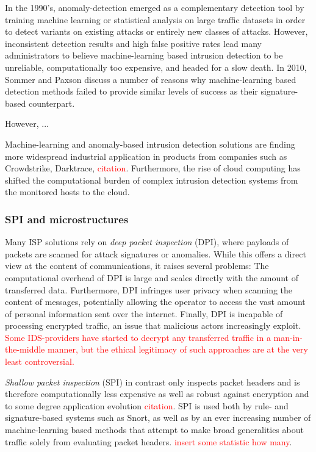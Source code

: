 In the 1990's, anomaly-detection emerged as a complementary detection tool by training machine learning or statistical analysis on large traffic datasets in order to detect variants on existing attacks or entirely new classes of attacks. However, inconsistent detection results and high false positive rates lead many administrators to believe machine-learning based intrusion detection to be unreliable, computationally too expensive, and headed for a slow death.
In 2010, Sommer and Paxson discuss a number of reasons why machine-learning based detection methods failed to provide similar levels of success as their signature-based counterpart.

However, ...

Machine-learning and anomaly-based intrusion detection solutions are finding more widespread industrial application in products from companies such as Crowdstrike, Darktrace, \textcolor{red}{citation}. Furthermore, the rise of cloud computing has shifted the computational burden of complex intrusion detection systems from the monitored hosts to the cloud.


\subsubsection{SPI and microstructures}

Many ISP solutions rely on \emph{deep packet inspection} (DPI), where payloads of packets are scanned for attack signatures or anomalies. While this offers a direct view at the content of communications, it raises several problems: The computational overhead of DPI is large and scales directly with the amount of transferred data. Furthermore, DPI infringes user privacy when scanning the content of messages, potentially allowing the operator to access the vast amount of personal information sent over the internet. Finally, DPI is incapable of processing encrypted traffic, an issue that malicious actors increasingly exploit. \textcolor{red}{Some IDS-providers have started to decrypt any transferred traffic in a man-in-the-middle manner, but the ethical legitimacy of such approaches are at the very least controversial.}

\emph{Shallow packet inspection} (SPI) in contrast only inspects packet headers and is therefore computationally less expensive as well as robust against encryption and to some degree application evolution \textcolor{red}{citation}. SPI is used both by rule- and signature-based systems such as Snort, as well as by an ever increasing number of machine-learning based methods that attempt to make broad generalities about traffic solely from evaluating packet headers. \textcolor{red}{insert some statistic how many}.

